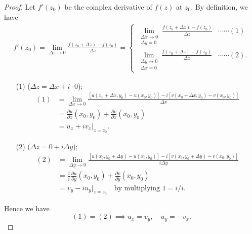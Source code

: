 \documentclass[12pt,openany]{book}
\theoremstyle{definition}
\newcommand{\of}[1]{\left( #1 \right)}
\begin{document}
	\begin{proof}
		Let $f'(z_0)$ be the complex derivative of $f(z)$ at $z_0$. By definition, we have \begin{align*}
			f'(z_0)=\lim_{\Delta z\to 0}\frac{f\of{z_0+\Delta z}-f\of{z_0}}{\Delta z}=\begin{cases}
				\displaystyle\lim\limits_{\substack{\Delta x\to 0\\ \Delta y=0}}\frac{f\of{z_0+\Delta z}-f\of{z_0}}{\Delta z} &\cdots\cdots(1)\\
				\displaystyle\lim\limits_{\substack{\Delta y\to 0\\ \Delta x=0}}\frac{f\of{z_0+\Delta z}-f\of{z_0}}{\Delta z}&\cdots\cdots(2).
			\end{cases}
		\end{align*}
		
		\begin{itemize}
			\item[(1)] ($\Delta z=\Delta x+i\cdot 0$);
			\begin{align*}
				(1)&=\lim\limits_{\Delta x\to 0}\frac{\left[u(x_0+\Delta x, y_0)-u\of{x_0,y_0}\right]-i\left[v(x_0+\Delta x,y_0)-v\of{x_0,y_0}\right]}{\Delta x}\\
				&=\frac{\partial u}{\partial x}\of{x_0,y_0}+\frac{\partial v}{\partial x}\of{x_0,y_0}\\
				&= u_x+iv_x\bigg|_{z=z_0}.
			\end{align*}
			\item[(2)] ($\Delta z=0+i\Delta y$);
			\begin{align*}
				(2)&=\lim\limits_{\Delta y\to 0}\frac{\left[u(x_0, y_0+\Delta y)-u\of{x_0,y_0}\right]-i\left[v(x_0,y_0+\Delta y)-v\of{x_0,y_0}\right]}{i\Delta y}\\
				&=\frac{1}{i}\frac{\partial u}{\partial y}\of{x_0,y_0}+\frac{\partial v}{\partial y}\of{x_0,y_0}\\
				&= v_y-iu_y\bigg|_{z=z_0}\quad\text{by multiplying $1=i/i$}.
			\end{align*}
		\end{itemize} Hence we have \[
		(1)=(2)\implies u_x=v_y,\quad u_y=-v_x.
		\]
	\end{proof}
	
\end{document}
